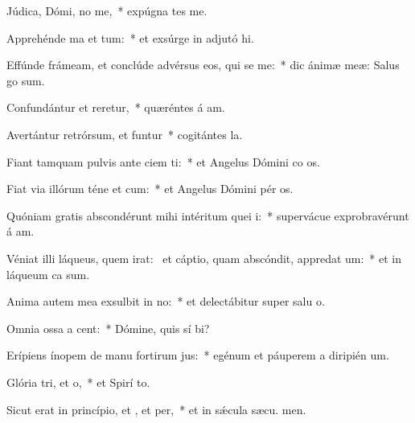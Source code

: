 \item Júdica, Dómi, no me,~* expúgna tes me.
\item Apprehénde ma et tum:~* et exsúrge in adjutó hi.
\item Effúnde frámeam, et conclúde advérsus eos, qui se me:~* dic ánimæ meæ: Salus  go sum.
\item Confundántur et reretur,~* quæréntes á am.
\item Avertántur retrórsum, et funtur~* cogitántes  la.
\item Fiant tamquam pulvis ante ciem ti:~* et Angelus Dómini co os.
\item Fiat via illórum téne et cum:~* et Angelus Dómini pér os.
\item Quóniam gratis abscondérunt mihi intéritum quei i:~* supervácue exprobravérunt á am.
\item Véniat illi láqueus, quem irat:~\pscross{} et cáptio, quam abscóndit, appredat um:~* et in láqueum ca  sum.
\item Anima autem mea exsulbit in no:~* et delectábitur super salu o.
\item Omnia ossa a cent:~* Dómine, quis sí bi?
\item Erípiens ínopem de manu fortirum jus:~* egénum et páuperem a diripién um.
\item Glória tri, et o,~* et Spirí to.
\item Sicut erat in princípio, et , et per,~* et in sǽcula sæcu. men.

